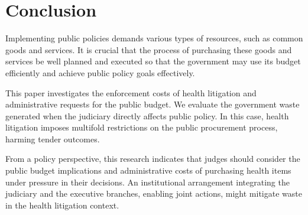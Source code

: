 \section{Conclusion}
Implementing public policies demands various types of resources, such as common goods and services. It is crucial that the process of purchasing these goods and services be well planned and executed so that the government may use its budget efficiently and achieve public policy goals effectively.

This paper investigates the enforcement costs of health litigation and administrative requests for the public budget. We evaluate the government waste generated when the judiciary directly affects public policy. In this case, health litigation imposes multifold restrictions on the public procurement process, harming tender outcomes.

From a policy perspective, this research indicates that judges should consider the public budget implications and administrative costs of purchasing health items under pressure in their decisions. An institutional arrangement integrating the judiciary and the executive branches, enabling joint actions, might mitigate waste in the health litigation context.
